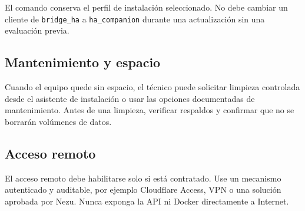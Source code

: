 El comando conserva el perfil de instalación seleccionado. No debe cambiar un cliente de \texttt{bridge\_ha} a \texttt{ha\_companion} durante una actualización sin una evaluación previa.

\subsection{Mantenimiento y espacio}
Cuando el equipo quede sin espacio, el técnico puede solicitar limpieza controlada desde el asistente de instalación o usar las opciones documentadas de mantenimiento. Antes de una limpieza, verificar respaldos y confirmar que no se borrarán volúmenes de datos.

\subsection{Acceso remoto}
El acceso remoto debe habilitarse solo si está contratado. Use un mecanismo autenticado y auditable, por ejemplo Cloudflare Access, VPN o una solución aprobada por Nezu. Nunca exponga la API ni Docker directamente a Internet.
